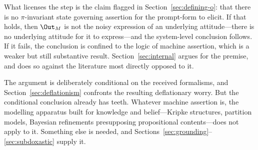 What licenses the step is the claim flagged in Section~\ref{sec:defining-o}:
that there is no $\pi$-invariant state governing assertion for the prompt-form
to elicit. If that holds, then $\Out_M$ is not the noisy expression of an
underlying attitude---there is no underlying attitude for it to express---and the
system-level conclusion follows. If it fails, the conclusion is confined to the
logic of machine assertion, which is a weaker but still substantive result.
Section~\ref{sec:internal} argues for the premise, and does so against the
literature most directly opposed to it.

The argument is deliberately conditional on the received formalisms, and
Section~\ref{sec:deflationism} confronts the resulting deflationary worry. But
the conditional conclusion already has teeth. Whatever machine assertion is, the
modelling apparatus built for knowledge and belief---Kripke structures,
partition models, Bayesian refinements presupposing propositional
contents---does not apply to it. Something else is needed, and
Sections~\ref{sec:grounding}--\ref{sec:subdoxastic} supply it.
